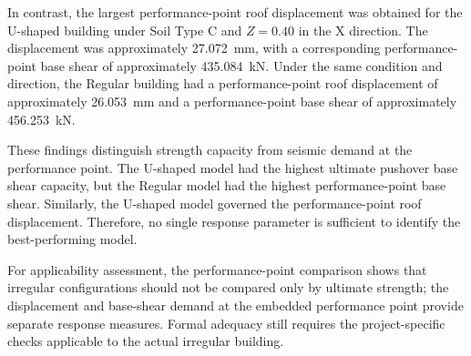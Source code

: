 In contrast, the largest performance-\allowbreak{}point roof displacement was obtained for the U-shaped building under Soil Type C and $Z=0.40$ in the X direction. The displacement was approximately 27.072~mm, with a corresponding performance-\allowbreak{}point base shear of approximately 435.084~kN. Under the same condition and direction, the Regular building had a performance-\allowbreak{}point roof displacement of approximately 26.053~mm and a performance-\allowbreak{}point base shear of approximately 456.253~kN.

These findings distinguish strength capacity from seismic demand at the performance point. The U-shaped model had the highest ultimate pushover base shear capacity, but the Regular model had the highest performance-\allowbreak{}point base shear. Similarly, the U-shaped model governed the performance-\allowbreak{}point roof displacement. Therefore, no single response parameter is sufficient to identify the best-performing model.

For applicability assessment, the performance-point comparison shows that irregular configurations should not be compared only by ultimate strength; the displacement and base-shear demand at the embedded performance point provide separate response measures. Formal adequacy still requires the project-specific checks applicable to the actual irregular building.

\newcommand{\pptable}[3]{%
\begin{table}[!htbp]
\caption{Performance points for the #1 building.}
\label{#2}
\centering
\footnotesize
\setlength{\tabcolsep}{4pt}
\begin{adjustbox}{max width=\linewidth}
\begin{tabular}{@{}ccrrrr@{}}
\toprule
 & & \multicolumn{2}{c}{\textbf{X direction}} & \multicolumn{2}{c}{\textbf{Y direction}}\\
\textbf{Soil} & \textbf{Z} & \shortstack{\textbf{Base shear}\\\textbf{(kN)}} & \shortstack{\textbf{Roof displacement}\\\textbf{(mm)}} & \shortstack{\textbf{Base shear}\\\textbf{(kN)}} & \shortstack{\textbf{Roof displacement}\\\textbf{(mm)}}\\
\midrule
#3
\bottomrule
\end{tabular}
\end{adjustbox}
\end{table}}

